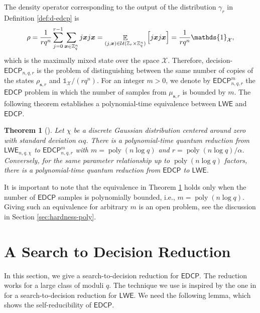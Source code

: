 \documentclass[11pt]{article}
\theoremstyle{plain}
\newtheorem{theorem}{Theorem}
\theoremstyle{definition}
\DeclareMathOperator{\poly}{poly}
\DeclareMathOperator{\E}{\mathbb{E}}
\let\ket\relax
\DeclarePairedDelimiter{\ket}{\lvert}{\rangle}
\let\bra\relax
\DeclarePairedDelimiter{\bra}{\langle}{\rvert}
\def\Z{\mathbb{Z}}
\def\lwe{\mathsf{LWE}}
\def\edcp{\mathsf{EDCP}}
\def\X{\mathcal{X}}
\def\U{\mathcal{U}}
\begin{document}
The density operator corresponding to the output of the distribution $\gamma_r$ in Definition \ref{def:d-edcp} is
\[ \rho = \frac{1}{rq^n} \sum_{j = 0}^{r - 1} \sum_{\bm{x} \in \Z_q^n}  \ket{j}\ket{\bm{x}} \bra{j}\bra{\bm{x}} = \E_{(j, \bm{x}) \in \U(\Z_r \times \Z_q^n)} \Big[ \ket{j}\ket{\bm{x}} \bra{j}\bra{\bm{x}} \Big] = \frac{1}{rq^n} \mathds{1}_{\X}, \]
which is the maximally mixed state over the space $\X$. Therefore, decision-$\edcp_{n, q, r}$ is the problem of distinguishing between the same number of copies of the states $\rho_{\bm{s}, r}$ and $\mathds{1}_{\X} / (rq^n)$. For an integer $m > 0$, we denote by $\edcp_{n, q, r}^m$ the $\edcp$ problem in which the number of samples from $\mu_{\bm{s}, r}$ is bounded by $m$. The following theorem establishes a polynomial-time equivalence between $\lwe$ and $\edcp$.

\begin{theorem}[\cite{brakerski2018learning}]
    \label{thm:lwe-edcp}
    Let $\chi$ be a discrete Gaussian distribution centered around zero with standard deviation $\alpha q$. There is a polynomial-time quantum reduction from $\lwe_{n, q, \chi}$ to $\edcp_{n, q, r}^m$ with $m = \poly(n\log q)$ and $r = \poly(n\log q) / \alpha$. Conversely, for the same parameter relationship up to $\poly(n\log q)$ factors, there is a polynomial-time quantum reduction from $\edcp$ to $\lwe$. 
\end{theorem}

It is important to note that the equivalence in Theorem \ref{thm:lwe-edcp} holds only when the number of $\edcp$ samples is polynomially bounded, i.e., $m = \poly(n\log q)$. Giving such an equivalence for arbitrary $m$ is an open problem, see the discussion in Section \ref{sec:hardness-poly}.





\section{A Search to Decision Reduction}
\label{sec:old-search-dec}

In this section, we give a search-to-decision reduction for $\edcp$. The reduction works for a large class of moduli $q$. The technique we use is inspired by the one in \cite{micciancio2012trapdoors} for a search-to-decision reduction for $\lwe$. We need the following lemma, which shows the self-reducibility of $\edcp$.
\end{document}
